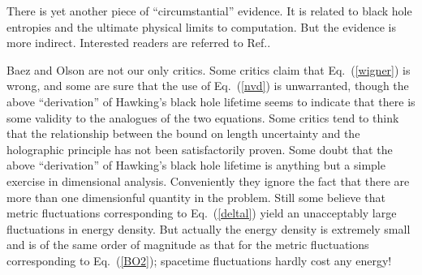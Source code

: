 \documentclass[preprint2]{aastex}
\begin{document}
There is yet another piece of ``circumstantial''
evidence.  It is related to black hole entropies and the ultimate
physical limits to computation.  But the evidence is more indirect.
Interested readers are referred to Ref.\citep{ngy02}.

Baez and Olson are not our only critics.  Some critics claim that
Eq.~(\ref{wigner}) is wrong,\citep{adl00,oza02} and some are sure that
the use of
Eq.~(\ref{nvd}) is unwarranted, though the above ``derivation'' of
Hawking's black hole lifetime seems to indicate that
there is some validity to the analogues of
the two equations.
Some critics tend to think that the relationship
between the bound on length uncertainty and the holographic principle
has not been satisfactorily proven.  Some doubt
that the above ``derivation'' of Hawking's
black hole lifetime is anything but a simple exercise in
dimensional analysis.  Conveniently they ignore the fact
that there are more than one dimensionful quantity in the problem.
Still some believe that metric
fluctuations corresponding to Eq.~(\ref{deltal}) yield an unacceptably
large fluctuations in energy density.\citep{dio96}  But actually the
energy density is extremely small\citep{ngy97} and is of the
same order of
magnitude as that for the metric fluctuations corresponding to
Eq.~(\ref{BO2}); spacetime fluctuations hardly cost any energy!
\end{document}

